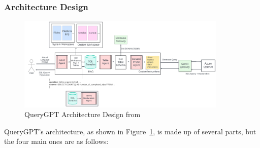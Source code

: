         \subsubsection{Architecture Design}
        \begin{figure}[H]
            \centering
            \includegraphics[width=10cm]{chapters/2/figures/query-gpt-architecture.png}
            \caption[QueryGPT Architecture Design]{QueryGPT Architecture Design  from~\cite{QueryGPT}}
            \label{fig:query-gpt-architecture}
        \end{figure}
        QueryGPT's architecture, as shown in Figure~\ref{fig:query-gpt-architecture}, is made up of several parts, but the four main ones are as follows:
